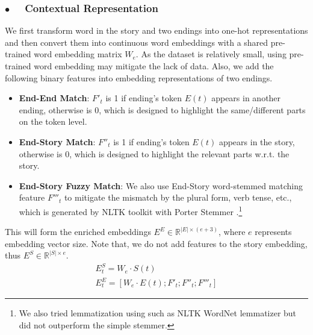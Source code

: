 \documentclass[letterpaper]{article} %
\begin{document}
\subsubsection*{$\bullet$~~ Contextual Representation}
We first transform word in the story and two endings into one-hot representations and then convert them into continuous word embeddings with a shared pre-trained word embedding matrix $W_e$. As the dataset is relatively small, using pre-trained word embedding may mitigate the lack of data.
Also, we add the following binary features into embedding representations of two endings.
\begin{itemize}
\item {\bf End-End Match}: $F'_t$ is 1 if ending's token $E(t)$ appears in another ending, otherwise is 0, which is designed to highlight the same/different parts on the token level.
\item {\bf End-Story Match}: $F''_t$ is 1 if ending's token $E(t)$ appears in the story, otherwise is 0, which is designed to highlight the relevant parts w.r.t. the story.
\item {\bf End-Story Fuzzy Match}: We also use End-Story word-stemmed matching feature $F'''_t$ to mitigate the mismatch by the plural form, verb tense, etc., which is generated by NLTK toolkit \cite{nltk} with Porter Stemmer \cite{porter1980algorithm}.\footnote{We also tried lemmatization using such as NLTK WordNet lemmatizer but did not outperform the simple stemmer.}
\end{itemize}

This will form the enriched embeddings $E^E \in \mathbb{R}^{|E| \times (e+3)}$, where $e$ represents embedding vector size. Note that, we do not add features to the story embedding, thus $E^S \in \mathbb{R}^{|S| \times e}$.
\begin{gather}
E^S_t = W_e \cdot S(t) \\
E^E_t = [W_e \cdot E(t) ; F'_t ; F''_t ; F'''_t]
\end{gather}
\end{document}
